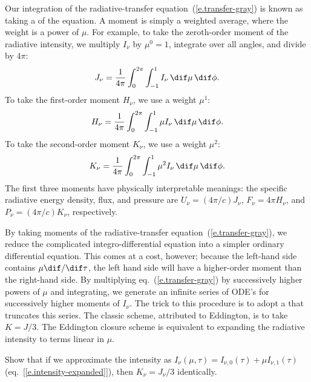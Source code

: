 \begin{sidebar}
\label{sb.intensity-moments}
Our integration of the radiative-transfer equation~(\ref{e.transfer-gray}) is known as taking a  of the equation. A moment is simply a weighted average, where the weight is a power of $\mu$. For example, to take the zeroth-order moment of the radiative intensity, we multiply $I_{\nu}$ by $\mu^{0}=1$, integrate over all angles, and divide by $4\pi$:
\[
	J_{\nu} = \frac{1}{4\pi}\int_{0}^{2\pi}\int_{-1}^{1} I_{\nu}\,\dif\mu\,\dif\phi.
\]
To take the first-order moment $H_{\nu}$, we use a weight $\mu^{1}$:
\[
	H_{\nu} = \frac{1}{4\pi}\int_{0}^{2\pi}\int_{-1}^{1}\mu I_{\nu}\,\dif\mu\,\dif\phi.
\]
To take the second-order moment $K_{\nu}$, we use a weight $\mu^{2}$:
\[
	K_{\nu} = \frac{1}{4\pi}\int_{0}^{2\pi}\int_{-1}^{1}\mu^{2} I_{\nu}\,\dif\mu\,\dif\phi.
\]
The first three moments have physically interpretable meanings: the specific radiative energy density, flux, and pressure are $U_{\nu} = (4\pi/c)J_{\nu}$, $F_{\nu} = 4\pi H_{\nu}$, and $P_{\nu} = (4\pi/c) K_{\nu}$, respectively.

By taking moments of the radiative-transfer equation~(\ref{e.transfer-gray}), we reduce the complicated integro-differential equation into a simpler ordinary differential equation. This comes at a cost, however; because the left-hand side contains $\mu\dif/\dif\tau$, the left hand side will have a higher-order moment than the right-hand side. By multiplying eq.~(\ref{e.transfer-gray}) by successively higher powers of $\mu$ and integrating, we generate an infinite series of ODE's for successively higher moments of $I_{\nu}$. The trick to this procedure is to adopt a  that truncates this series. The classic scheme, attributed to Eddington, is to take $K = J/3$. The Eddington closure scheme is equivalent to expanding the radiative intensity to terms linear in $\mu$.

\begin{exercisebox}
Show that if we approximate the intensity as $I_{\nu}(\mu,\tau) = I_{\nu,0}(\tau) + \mu I_{\nu,1}(\tau)$ (eq.~[\ref{e.intensity-expanded}]), then $K_{\nu} = J_{\nu}/3$ identically.
\end{exercisebox}
\end{sidebar}


